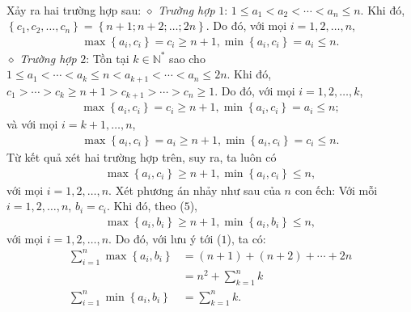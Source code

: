 \begin{multicols}{2}
\begin{align*}
	\end{align*}
	Xảy ra hai trường hợp sau:
	\vskip 0.05cm
	$\diamond$ \textit{Trường hợp} $1$: $1 \le {a_1} < {a_2} < \cdots  < {a_n} \le n.$
	\vskip 0.05cm  
	Khi đó, $\left\{ {{c_1},{c_2}, \ldots ,{c_n}} \right\} \!=\! \left\{ {n \!+\! 1;n \!+\! 2; \ldots ;2n} \right\}\!.$  Do đó, với mọi $i = 1, 2, \ldots, n$,
	\begin{align*}
		\max \!\left\{\! {{a_i},{c_i}} \!\right\} \!=\! {c_i} \!\ge\! n \!+\! 1, \min\! \left\{\! {{a_i},{c_i}} \!\right\} \!=\! {a_i} \!\le\! n.
	\end{align*}
	$\diamond$ \textit{Trường hợp} $2$: Tồn tại $k \in \mathbb{N^*}$  sao cho  $1 \le {a_1} <  \cdots  < {a_k} \le n < {a_{k + 1}} <  \cdots  < {a_n} \le 2n.$ 
	\vskip 0.05cm
	Khi đó, ${c_1} >  \cdots  > {c_k} \ge n + 1 > {c_{k + 1}} >  \cdots  > {c_n} \ge 1.$ 
	\vskip 0.05cm
	Do đó, với mọi $i = 1, 2, \ldots , k$,
	\begin{align*}
		\max \!\left\{\! {{a_i},{c_i}} \!\right\} \!=\! {c_i} \!\ge\! n \!+\! 1, \min\! \left\{ \!{{a_i},{c_i}} \!\right\} \!=\! {a_i} \!\le\! n;
	\end{align*}
	và với mọi $i = k + 1, \ldots , n$,
	\begin{align*}
		\max\! \left\{\! {{a_i},{c_i}} \!\right\} \!=\! {a_i} \!\ge\! n \!+\! 1, \min\! \left\{\! {{a_i},{c_i}} \!\right\} \!=\! {c_i} \!\le\! n.
	\end{align*}
	Từ kết quả xét hai trường hợp trên, suy ra, ta luôn có
	\begin{align*}
		\max \!\left\{\! {{a_i},{c_i}} \!\right\} \!\ge\! n \!+\! 1,\min\! \left\{\! {{a_i},{c_i}} \!\right\} \!\le\! n, \tag{$5$}
	\end{align*}
	với mọi $i = 1, 2, \ldots, n$.
	\vskip 0.05cm
	Xét phương án nhảy như sau của $n$ con ếch: Với mỗi $i = 1, 2, \ldots, n$, $b_i = c_i$.
	\vskip 0.05cm  
	Khi đó, theo ($5$),
	\begin{align*}
		\max \!\left\{\! {{a_i},{b_i}} \!\right\} \!\ge\! n \!+\! 1,\min\! \left\{\! {{a_i},{b_i}} \!\right\} \!\le\! n,
	\end{align*}
	với mọi $i = 1, 2, \ldots , n$.
	\vskip 0.05cm
	Do đó, với lưu ý tới ($1$), ta có:
	\begin{align*}
		\sum\limits_{i = 1}^n {\max \left\{ {{a_i},{b_i}} \right\}}  &= \left( {n \!+\! 1} \right) \!+\! \left( {n \!+\! 2} \right) \!+\!  \cdots \! +\! 2n \\[-1.2ex]
		&= {n^2} + \sum\limits_{k = 1}^n k\\[-1.2ex]
		\sum\limits_{i = 1}^n {\min \left\{ {{a_i},{b_i}} \right\}}  &= \sum\limits_{k = 1}^n k.

\end{align*}
\end{multicols}
